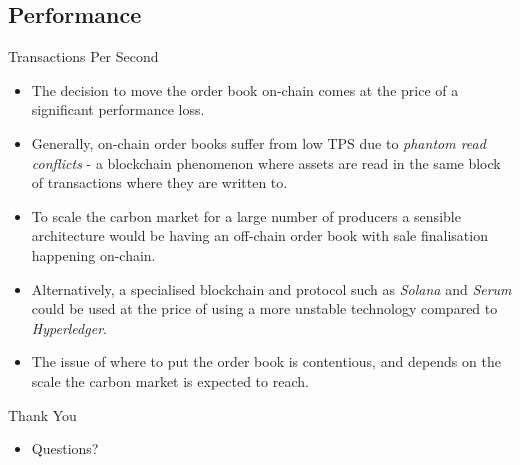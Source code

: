 \subsection{Performance}
\begin{frame}{Transactions Per Second}
    \begin{itemize}
        \item The decision to move the order book on-chain comes at the
              price of a significant performance loss.
        \item Generally, on-chain order books suffer from low TPS
              due to \textit{phantom read conflicts} - a blockchain
              phenomenon where assets are read in the same block of
              transactions where they are written to.
        \item To scale the carbon market for a large number of producers
              a sensible architecture would be having an off-chain order
              book with sale finalisation happening on-chain.
        \item Alternatively, a specialised blockchain and protocol
              such as \textit{Solana} and \textit{Serum} could be used
              at the price of using a more unstable technology compared to
              \textit{Hyperledger}.
        \item The issue of where to put the order book is contentious,
              and depends on the scale the carbon market is expected to reach.
    \end{itemize}
\end{frame}
\begin{frame}{Thank You}
    \begin{itemize}
        \item Questions?
    \end{itemize}
\end{frame}